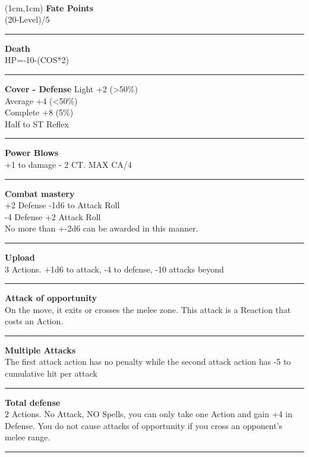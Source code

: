\documentclass[a4paper,12 pt,openany]{book}
\newcommand{\linex}{\rule{\textwidth}{0.4pt}}
\begin{document}
~\newpage

\begin{textblock*}{4cm}(1cm,1cm) %
{\textbf{Fate Points}\\
(20-Level)/5}

\linex

{\textbf{Death}\\
HP=-10-(COS*2)}

\linex

\textbf{Cover - Defense}
Light +2 (>50\%)\\
Average +4 (<50\%)\\
Complete +8 (5\%)\\
Half to ST Reflex

\linex

\textbf{Power Blows}\\
+1 to damage - 2 CT. MAX CA/4

\linex

\textbf{Combat mastery}\\
+2 Defense -1d6 to Attack Roll\\
-4 Defense +2 Attack Roll \\
No more than +-2d6 can be awarded in this manner.

\linex

\textbf{Upload}\\
3 Actions. +1d6 to attack, -4 to defense, -10 attacks beyond

\linex

\textbf{Attack of opportunity}\\
On the move, it exits or crosses the melee zone. This attack is a Reaction that costs an Action.

\linex

\textbf{Multiple Attacks}\\
The first attack action has no penalty while the second attack action has -5 to cumulative hit per attack

\linex

\textbf{Total defense}\\
2 Actions. No Attack, NO Spells, you can only take one Action and gain +4 in Defense. You do not cause attacks of opportunity if you cross an opponent's melee range.

\linex


\end{textblock*}
\end{document}
